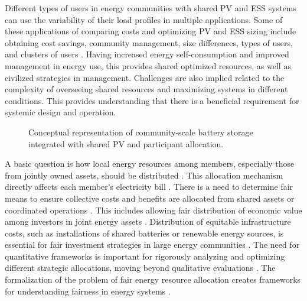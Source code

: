 Different types of users in energy communities with shared PV and ESS
systems can use the variability of their load profiles in multiple
applications. Some of these applications of comparing costs and
optimizing PV and ESS sizing include obtaining cost savings, community
management, size differences, types of users, and clusters of users
\cite{ch2ref041}. Having increased energy self-consumption and improved
management in energy use, this provides shared optimized resources, as
well as civilized strategies in management. Challenges are also implied
related to the complexity of overseeing shared resources and maximizing
systems in different conditions. This provides understanding that there
is a beneficial requirement for systemic design and operation.

\begin{figure}[H]
\centering
{}
\caption{Conceptual representation of community-scale battery storage integrated with shared PV and participant allocation.}\label{fig:ch2-community-bess}
\end{figure}

A basic question is how local energy resources among members, especially
those from jointly owned assets, should be distributed
\cite{ch2ref071}. This allocation mechanism directly affects each member's
electricity bill \cite{ch2ref071}. There is a need to determine fair means
to ensure collective costs and benefits are allocated from shared assets
or coordinated operations \cite{ch2ref070}. This includes allowing fair
distribution of economic value among investors in joint energy assets
\cite{ch2ref071}. Distribution of equitable infrastructure costs, such as
installations of shared batteries or renewable energy sources, is
essential for fair investment strategies in large energy communities
\cite{ch2ref070}. The need for quantitative frameworks is important for rigorously
analyzing and optimizing different strategic allocations, moving beyond
qualitative evaluations \cite{ch2ref072}. The formalization of the problem
of fair energy resource allocation creates frameworks for understanding
fairness in energy systems \cite{ch2ref072}.

